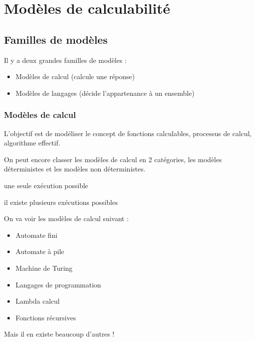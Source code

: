 
\chapter{Modèles de calculabilité}
\label{sec:mod_le_de_la_calculabilit_}

\section{Familles de modèles}
\label{sub:fammilles_de_mod_les}

Il y a deux grandes familles de modèles :
\begin{itemize}
	\item Modèles de calcul (calcule une réponse)
	\item Modèles de langages (décide l'appartenance à un ensemble)
\end{itemize}

\subsection{Modèles de calcul}
\label{ssub:mod_le_de_calcul}
L'objectif est de modéliser le concept de fonctions calculables, processus de
calcul, algorithme effectif.

On peut encore classer les modèles de calcul en 2 catégories, les
modèles déterministes et les modèles non déterministes.

\begin{mydef} une seule exécution possible
\end{mydef}

\begin{mydef} il existe plusieurs exécutions
	possibles
\end{mydef}

On va voir les modèles de calcul suivant :
\begin{itemize}
	\item Automate fini
	\item Automate à pile
	\item Machine de Turing
	\item Langages de programmation
	\item Lambda calcul
	\item Fonctions récursives
\end{itemize}
Mais il en existe beaucoup d'autres !

